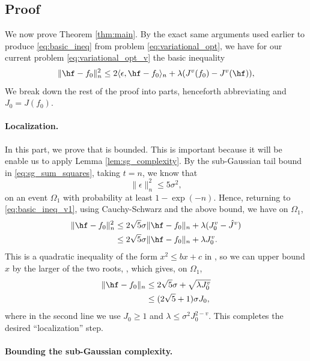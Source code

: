 \documentclass{article}
\begin{document}
\subsection{Proof}

We now prove Theorem \ref{thm:main}. By the exact same arguments used earlier to
produce \eqref{eq:basic_ineq} from problem \eqref{eq:variational_opt}, we have
for our current problem \eqref{eq:variational_opt_v} the basic inequality     
\begin{equation}
\label{eq:basic_ineq_v1}
\|\hf - f_0\|_n^2 \leq 2 \langle \epsilon, \hf-f_0 \rangle_n + \lambda (J^v(f_0)
- J^v(\hf)), 
\end{equation} 
We break down the rest of the proof into parts, henceforth abbreviating
 and $J_0 = J(f_0)$.     

\paragraph{Localization.}

In this part, we prove that  is bounded. This is
important because it will be enable us to apply Lemma
\ref{lem:sg_complexity}. By the sub-Gaussian tail bound in
\eqref{eq:sg_sum_squares}, taking $t=n$, we know that    
\[
\|\epsilon\|_n^2 \leq 5\sigma^2,
\]
on an event $\Omega_1$ with probability at least $1-\exp(-n)$. Hence, returning
to  \eqref{eq:basic_ineq_v1}, using Cauchy-Schwarz and the above bound, we have
on $\Omega_1$, 
\begin{align*}
\|\hf-f_0\|_n^2 &\leq 2{\sqrt 5}\sigma \|\hf-f_0\|_n + 
  \lambda (J_0^v - {\hat  J}^v) \\  
&\leq 2{\sqrt 5}\sigma \|\hf-f_0\|_n + \lambda J_0^v.
\end{align*}
This is a quadratic inequality of the form $x^2 \leq bx + c$ in , so we can upper bound $x$ by the larger of the two roots,
, which gives, on
$\Omega_1$, 
\begin{align}
\nonumber
\|\hf-f_0\|_n &\leq 2{\sqrt 5}\sigma + \sqrt{\lambda J_0^v} \\
\label{eq:localization}
&\leq (2{\sqrt 5} + 1) \sigma J_0,
\end{align}
where in the second line we use $J_0\geq 1$ and $\lambda \leq \sigma^2 
J_0^{2-v}$. This completes the desired ``localization'' step.     

\paragraph{Bounding the sub-Gaussian complexity.}
\end{document}
